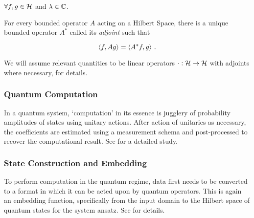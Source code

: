 \(\forall f, g \in \mathcal{H}\) and \(\lambda \in \mathbb{C}\). 

For every bounded operator \(A\) acting on a Hilbert Space, there is a unique
bounded operator \(A^*\) called its \emph{adjoint} such that

\begin{equation*}
    \langle f, Ag\rangle = \langle A^*f, g\rangle~.
\end{equation*}

We will assume relevant quantities to be linear operators \(\cdot :
\mathcal{H} \to \mathcal{H}\) with adjoints where necessary,
\cite[see][Appendix A]{hall2013quantum} for details.



\subsubsection{Quantum Computation}
In a quantum system, `computation' in its essence is jugglery of probability
amplitudes of states using unitary actions. After action of unitaries as
necessary, the coefficients are estimated using a measurement schema and
post-processed to recover the computational result. See
\cite{nielsen2002quantum} for a detailed study.

\subsubsection{State Construction and Embedding}
To perform computation in the quantum regime, data first needs to be converted
to a format in which it can be acted upon by quantum operators. This is again an
embedding function, specifically from the input domain to the Hilbert space of
quantum states for the system ansatz. See \cite{lloyd2020quantum} for details.

